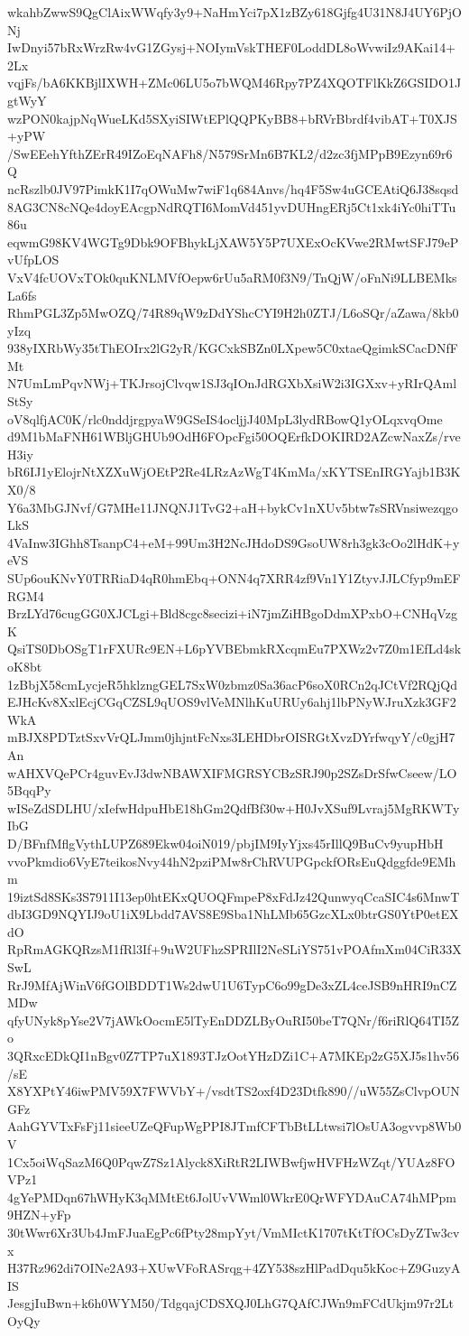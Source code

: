 wkahbZwwS9QgClAixWWqfy3y9+NaHmYci7pX1zBZy618Gjfg4U31N8J4UY6PjONj
IwDnyi57bRxWrzRw4vG1ZGysj+NOIymVskTHEF0LoddDL8oWvwiIz9AKai14+2Lx
vqjFs/bA6KKBjlIXWH+ZMc06LU5o7bWQM46Rpy7PZ4XQOTFlKkZ6GSIDO1JgtWyY
wzPON0kajpNqWueLKd5SXyiSIWtEPlQQPKyBB8+bRVrBbrdf4vibAT+T0XJS+yPW
/SwEEehYfthZErR49IZoEqNAFh8/N579SrMn6B7KL2/d2zc3fjMPpB9Ezyn69r6Q
ncRszlb0JV97PimkK1I7qOWuMw7wiF1q684Anvs/hq4F5Sw4uGCEAtiQ6J38sqsd
8AG3CN8cNQe4doyEAcgpNdRQTI6MomVd451yvDUHngERj5Ct1xk4iYc0hiTTu86u
eqwmG98KV4WGTg9Dbk9OFBhykLjXAW5Y5P7UXExOcKVwe2RMwtSFJ79ePvUfpLOS
VxV4fcUOVxTOk0quKNLMVfOepw6rUu5aRM0f3N9/TnQjW/oFnNi9LLBEMksLa6fs
RhmPGL3Zp5MwOZQ/74R89qW9zDdYShcCYI9H2h0ZTJ/L6oSQr/aZawa/8kb0yIzq
938yIXRbWy35tThEOIrx2lG2yR/KGCxkSBZn0LXpew5C0xtaeQgimkSCacDNfFMt
N7UmLmPqvNWj+TKJrsojClvqw1SJ3qIOnJdRGXbXsiW2i3IGXxv+yRIrQAmlStSy
oV8qlfjAC0K/rlc0nddjrgpyaW9GSeIS4ocljjJ40MpL3lydRBowQ1yOLqxvqOme
d9M1bMaFNH61WBljGHUb9OdH6FOpcFgi50OQErfkDOKIRD2AZcwNaxZs/rveH3iy
bR6IJ1yElojrNtXZXuWjOEtP2Re4LRzAzWgT4KmMa/xKYTSEnIRGYajb1B3KX0/8
Y6a3MbGJNvf/G7MHe11JNQNJ1TvG2+aH+bykCv1nXUv5btw7sSRVnsiwezqgoLkS
4VaInw3IGhh8TsanpC4+eM+99Um3H2NcJHdoDS9GsoUW8rh3gk3cOo2lHdK+yeVS
SUp6ouKNvY0TRRiaD4qR0hmEbq+ONN4q7XRR4zf9Vn1Y1ZtyvJJLCfyp9mEFRGM4
BrzLYd76cugGG0XJCLgi+Bld8cgc8secizi+iN7jmZiHBgoDdmXPxbO+CNHqVzgK
QsiTS0DbOSgT1rFXURc9EN+L6pYVBEbmkRXcqmEu7PXWz2v7Z0m1EfLd4skoK8bt
1zBbjX58cmLycjeR5hklzngGEL7SxW0zbmz0Sa36acP6soX0RCn2qJCtVf2RQjQd
EJHcKv8XxlEcjCGqCZSL9qUOS9vlVeMNlhKuURUy6ahj1lbPNyWJruXzk3GF2WkA
mBJX8PDTztSxvVrQLJmm0jhjntFcNxs3LEHDbrOISRGtXvzDYrfwqyY/c0gjH7An
wAHXVQePCr4guvEvJ3dwNBAWXIFMGRSYCBzSRJ90p2SZsDrSfwCseew/LO5BqqPy
wISeZdSDLHU/xIefwHdpuHbE18hGm2QdfBf30w+H0JvXSuf9Lvraj5MgRKWTyIbG
D/BFnfMflgVythLUPZ689Ekw04oiN019/pbjIM9IyYjxs45rIllQ9BuCv9yupHbH
vvoPkmdio6VyE7teikosNvy44hN2pziPMw8rChRVUPGpckfORsEuQdggfde9EMhm
19iztSd8SKs3S7911I13ep0htEKxQUOQFmpeP8xFdJz42QunwyqCcaSIC4s6MnwT
dbI3GD9NQYIJ9oU1iX9Lbdd7AVS8E9Sba1NhLMb65GzcXLx0btrGS0YtP0etEXdO
RpRmAGKQRzsM1fRl3If+9uW2UFhzSPRIlI2NeSLiYS751vPOAfmXm04CiR33XSwL
RrJ9MfAjWinV6fGOlBDDT1Ws2dwU1U6TypC6o99gDe3xZL4ceJSB9nHRI9nCZMDw
qfyUNyk8pYse2V7jAWkOocmE5lTyEnDDZLByOuRI50beT7QNr/f6riRlQ64TI5Zo
3QRxcEDkQI1nBgv0Z7TP7uX1893TJzOotYHzDZi1C+A7MKEp2zG5XJ5s1hv56/sE
X8YXPtY46iwPMV59X7FWVbY+/vsdtTS2oxf4D23Dtfk890//uW55ZsClvpOUNGFz
AahGYVTxFsFj11sieeUZeQFupWgPPI8JTmfCFTbBtLLtwsi7lOsUA3ogvvp8Wb0V
1Cx5oiWqSazM6Q0PqwZ7Sz1Alyck8XiRtR2LIWBwfjwHVFHzWZqt/YUAz8FOVPz1
4gYePMDqn67hWHyK3qMMtEt6JolUvVWml0WkrE0QrWFYDAuCA74hMPpm9HZN+yFp
30tWwr6Xr3Ub4JmFJuaEgPc6fPty28mpYyt/VmMIctK1707tKtTfOCsDyZTw3cvx
H37Rz962di7OINe2A93+XUwVFoRASrqg+4ZY538szHlPadDqu5kKoc+Z9GuzyAIS
JesgjIuBwn+k6h0WYM50/TdgqajCDSXQJ0LhG7QAfCJWn9mFCdUkjm97r2LtOyQy

